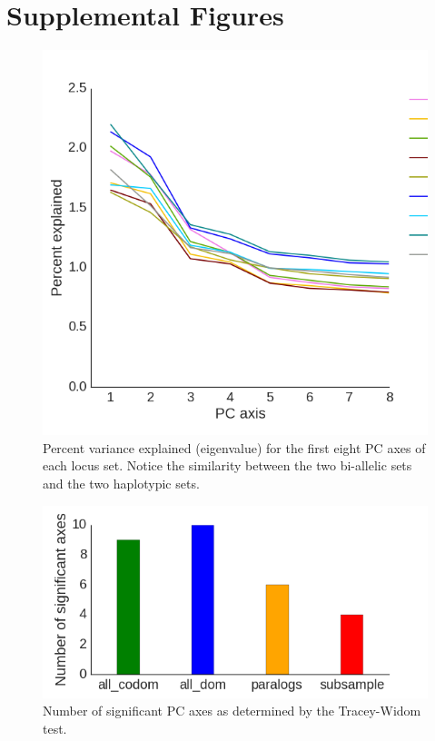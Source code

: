 \documentclass[12pt,  one column]{article}
\begin{document}
\pagebreak
\section*{Supplemental Figures}

\begin{figure}[H]
\includegraphics[scale=.4]{figures/supplemental/PCA_eigenvalues.png}
\caption{Percent variance explained (eigenvalue) for the first eight PC axes of each locus set.  Notice the similarity between the two bi-allelic sets and the two haplotypic sets.}
\end{figure}

\begin{figure}[H]
\includegraphics[scale=.4]{figures/supplemental/TW_stats.png}
\caption{Number of significant PC axes as determined by the Tracey-Widom test.}
\end{figure}
\end{document}
